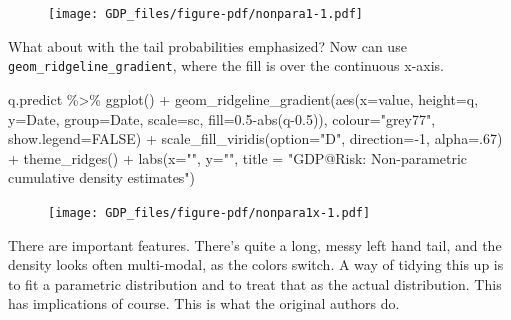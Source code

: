 \documentclass[
  letterpaper,
]{book}
\newenvironment{Shaded}{\begin{snugshade}}{\end{snugshade}}
\newcommand{\AttributeTok}[1]{\textcolor[rgb]{0.40,0.45,0.13}{#1}}
\newcommand{\ConstantTok}[1]{\textcolor[rgb]{0.56,0.35,0.01}{#1}}
\newcommand{\DecValTok}[1]{\textcolor[rgb]{0.68,0.00,0.00}{#1}}
\newcommand{\FloatTok}[1]{\textcolor[rgb]{0.68,0.00,0.00}{#1}}
\newcommand{\FunctionTok}[1]{\textcolor[rgb]{0.28,0.35,0.67}{#1}}
\newcommand{\NormalTok}[1]{\textcolor[rgb]{0.00,0.23,0.31}{#1}}
\newcommand{\SpecialCharTok}[1]{\textcolor[rgb]{0.37,0.37,0.37}{#1}}
\newcommand{\StringTok}[1]{\textcolor[rgb]{0.13,0.47,0.30}{#1}}
\begin{document}
\begin{figure}[H]

{\centering \texttt{[image: GDP\_files/figure-pdf/nonpara1-1.pdf]}

}

\end{figure}

What about with the tail probabilities emphasized? Now can use
\texttt{geom\_ridgeline\_gradient}, where the fill is over the
continuous x-axis.

\begin{Shaded}
\begin{Highlighting}[]
\NormalTok{q.predict }\SpecialCharTok{\%\textgreater{}\%} 
  \FunctionTok{ggplot}\NormalTok{() }\SpecialCharTok{+} 
  \FunctionTok{geom\_ridgeline\_gradient}\NormalTok{(}\FunctionTok{aes}\NormalTok{(}\AttributeTok{x=}\NormalTok{value, }\AttributeTok{height=}\NormalTok{q, }\AttributeTok{y=}\NormalTok{Date, }\AttributeTok{group=}\NormalTok{Date, }\AttributeTok{scale=}\NormalTok{sc, }
                              \AttributeTok{fill=}\FloatTok{0.5}\SpecialCharTok{{-}}\FunctionTok{abs}\NormalTok{(q}\FloatTok{{-}0.5}\NormalTok{)),  }
                          \AttributeTok{colour=}\StringTok{"grey77"}\NormalTok{, }\AttributeTok{show.legend=}\ConstantTok{FALSE}\NormalTok{) }\SpecialCharTok{+}
  \FunctionTok{scale\_fill\_viridis}\NormalTok{(}\AttributeTok{option=}\StringTok{"D"}\NormalTok{, }\AttributeTok{direction=}\SpecialCharTok{{-}}\DecValTok{1}\NormalTok{, }\AttributeTok{alpha=}\NormalTok{.}\DecValTok{67}\NormalTok{) }\SpecialCharTok{+}
  \FunctionTok{theme\_ridges}\NormalTok{() }\SpecialCharTok{+} 
  \FunctionTok{labs}\NormalTok{(}\AttributeTok{x=}\StringTok{""}\NormalTok{, }\AttributeTok{y=}\StringTok{""}\NormalTok{, }\AttributeTok{title =} \StringTok{"GDP@Risk: Non{-}parametric cumulative density estimates"}\NormalTok{)}
\end{Highlighting}
\end{Shaded}

\begin{figure}[H]

{\centering \texttt{[image: GDP\_files/figure-pdf/nonpara1x-1.pdf]}

}

\end{figure}

There are important features. There's quite a long, messy left hand
tail, and the density looks often multi-modal, as the colors switch. A
way of tidying this up is to fit a parametric distribution and to treat
that as the actual distribution. This has implications of course. This
is what the original authors do.
\end{document}
